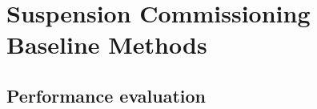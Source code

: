 \section{Suspension Commissioning Baseline Methods \label{sec:suspension_commissioning_baseline_methods}}
\subsection{Performance evaluation}
